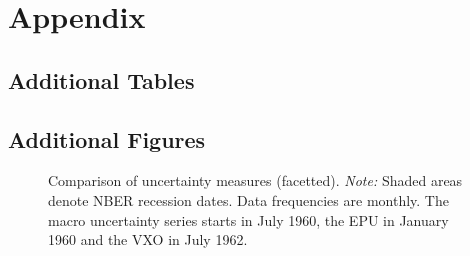 \documentclass[a4paper,11pt,listof=nochaptergap,oneside,pointednumbers,bibtotoc,bigheadings,liststotoc,hidelinks]{scrbook}
\theoremstyle{mysatz}
\theoremstyle{mydefinition}
\theoremstyle{mytheorem}
\theoremstyle{mybemerkung}
\begin{document}
\newpage
\appendix


\chapter{Appendix}
\label{VARAndLocalProjection}

\section{Additional Tables}
\label{sec:additionalTables}

\section{Additional Figures}
\label{sec:additionalFigures}
\begin{figure}[!ht]
   \centering
   \setlength\fboxsep{0pt}
   \setlength\fboxrule{0pt}
      \caption[Comparison of uncertainty measures.]{Comparison of uncertainty measures (facetted).
      \textit{Note:} Shaded areas denote NBER recession dates. Data frequencies are monthly. The macro uncertainty series starts in July 1960, the EPU in January 1960 and the VXO in July 1962.}   \label{fig:comparison_plot_combined}
\end{figure}
\end{document}
